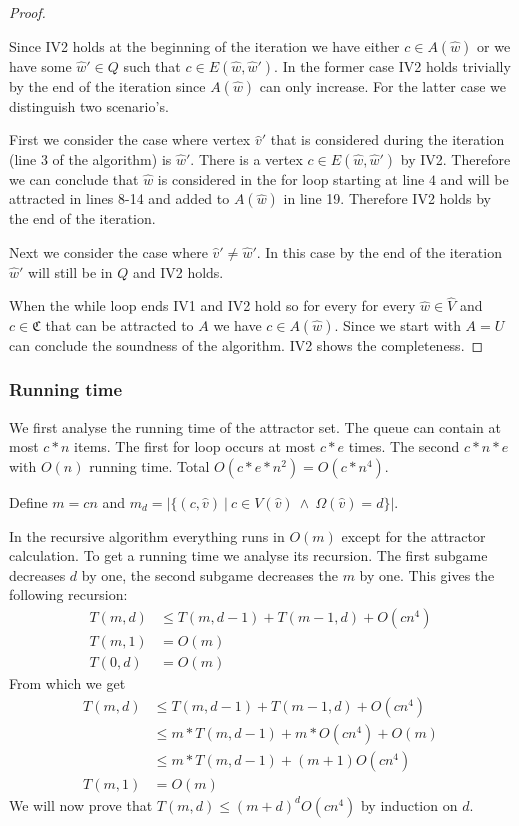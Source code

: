 \begin{theorem}
\begin{proof}
\begin{itemize}
			Since IV2 holds at the beginning of the iteration we have either $c \in A(\hat{w})$ or we have some $\hat{w}' \in Q$ such that $c \in E(\hat{w},\hat{w}')$. In the former case IV2 holds trivially by the end of the iteration since $A(\hat{w})$ can only increase. For the latter case we distinguish two scenario's. 
			
			First we consider the case where vertex $\hat{v}'$ that is considered during the iteration (line 3 of the algorithm) is $\hat{w}'$. There is a vertex $c \in E(\hat{w},\hat{w}')$ by IV2. Therefore we can conclude that $\hat{w}$ is considered in the for loop starting at line $4$ and will be attracted in lines 8-14 and added to $A(\hat{w})$ in line 19. Therefore IV2 holds by the end of the iteration.
			
			Next we consider the case where $\hat{v}' \neq \hat{w}'$. In this case by the end of the iteration $\hat{w}'$ will still be in $Q$ and IV2 holds.
		\end{itemize}
	
		When the while loop ends IV1 and IV2 hold so for every for every $\hat{w} \in \hat{V}$ and $c \in \mathfrak{C}$ that can be attracted to $A$ we have $c \in A(\hat{w})$. Since we start with $A = U$ can conclude the soundness of the algorithm. IV2 shows the completeness.
	\end{proof}
\end{theorem}


\subsubsection{Running time}
We first analyse the running time of the attractor set. The queue can contain at most $c * n$ items. The first for loop occurs at most $c * e$ times. The second $c * n * e$ with $O(n)$ running time. Total $O(c * e * n^2) = O(c*n^4)$.

Define $m = cn$ and $m_d = |\{(c,\hat{v})\ |\ c\in V(\hat{v})\ \wedge\ \Omega(\hat{v}) = d\}|$.

In the recursive algorithm everything runs in $O(m)$ except for the attractor calculation. To get a running time we analyse its recursion. The first subgame decreases $d$ by one, the second subgame decreases the $m$ by one. This gives the following recursion:
\begin{align*}
T(m,d) &\leq T(m, d-1) + T(m-1, d) + O(cn^4)\\
T(m,1) &= O(m)\\
T(0,d) &= O(m)
\end{align*}
From which we get 
\begin{align*}
T(m,d) &\leq T(m, d-1) + T(m-1, d) + O(cn^4)\\
&\leq m*T(m, d-1) + m*O(cn^4) + O(m)\\
&\leq m*T(m, d-1) + (m+1)O(cn^4)\\
T(m,1) &= O(m)
\end{align*}
We will now prove that $T(m,d) \leq (m+d)^dO(cn^4)$ by induction on $d$.

